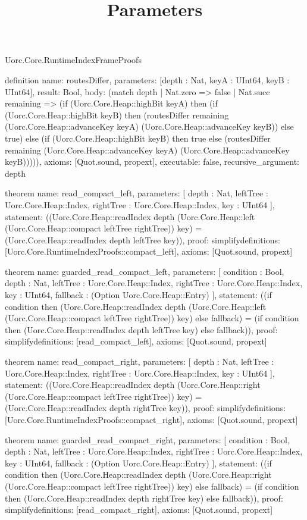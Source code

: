 \begin{lexlean}{Uorc.Core.RuntimeIndexFrameProofs}
\title{Parameters}
\begin{semanticmodule}
definition{
  name: routesDiffer,
  parameters: [depth : Nat, keyA : UInt64, keyB : UInt64],
  result: Bool,
  body: (match depth
    | Nat.zero => false
    | Nat.succ remaining => (if (Uorc.Core.Heap::highBit keyA) then (if (Uorc.Core.Heap::highBit keyB) then (routesDiffer remaining (Uorc.Core.Heap::advanceKey keyA) (Uorc.Core.Heap::advanceKey keyB)) else true) else (if (Uorc.Core.Heap::highBit keyB) then true else (routesDiffer remaining (Uorc.Core.Heap::advanceKey keyA) (Uorc.Core.Heap::advanceKey keyB))))),
  axioms: [Quot.sound, propext],
  executable: false,
  recursive_argument: depth
}

theorem{
  name: read_compact_left,
  parameters: [
    depth : Nat,
    leftTree : Uorc.Core.Heap::Index,
    rightTree : Uorc.Core.Heap::Index,
    key : UInt64
  ],
  statement: ((Uorc.Core.Heap::readIndex depth (Uorc.Core.Heap::left (Uorc.Core.Heap::compact leftTree rightTree)) key) = (Uorc.Core.Heap::readIndex depth leftTree key)),
  proof: simplify{definitions: [Uorc.Core.RuntimeIndexProofs::compact_left]},
  axioms: [Quot.sound, propext]
}

theorem{
  name: guarded_read_compact_left,
  parameters: [
    condition : Bool,
    depth : Nat,
    leftTree : Uorc.Core.Heap::Index,
    rightTree : Uorc.Core.Heap::Index,
    key : UInt64,
    fallback : (Option Uorc.Core.Heap::Entry)
  ],
  statement: ((if condition then (Uorc.Core.Heap::readIndex depth (Uorc.Core.Heap::left (Uorc.Core.Heap::compact leftTree rightTree)) key) else fallback) = (if condition then (Uorc.Core.Heap::readIndex depth leftTree key) else fallback)),
  proof: simplify{definitions: [read_compact_left]},
  axioms: [Quot.sound, propext]
}

theorem{
  name: read_compact_right,
  parameters: [
    depth : Nat,
    leftTree : Uorc.Core.Heap::Index,
    rightTree : Uorc.Core.Heap::Index,
    key : UInt64
  ],
  statement: ((Uorc.Core.Heap::readIndex depth (Uorc.Core.Heap::right (Uorc.Core.Heap::compact leftTree rightTree)) key) = (Uorc.Core.Heap::readIndex depth rightTree key)),
  proof: simplify{definitions: [Uorc.Core.RuntimeIndexProofs::compact_right]},
  axioms: [Quot.sound, propext]
}

theorem{
  name: guarded_read_compact_right,
  parameters: [
    condition : Bool,
    depth : Nat,
    leftTree : Uorc.Core.Heap::Index,
    rightTree : Uorc.Core.Heap::Index,
    key : UInt64,
    fallback : (Option Uorc.Core.Heap::Entry)
  ],
  statement: ((if condition then (Uorc.Core.Heap::readIndex depth (Uorc.Core.Heap::right (Uorc.Core.Heap::compact leftTree rightTree)) key) else fallback) = (if condition then (Uorc.Core.Heap::readIndex depth rightTree key) else fallback)),
  proof: simplify{definitions: [read_compact_right]},
  axioms: [Quot.sound, propext]
}


\end{semanticmodule}
\end{lexlean}
